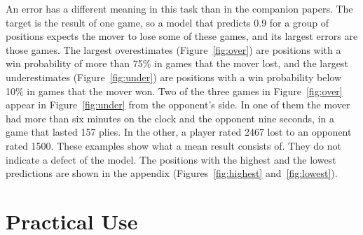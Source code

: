 \documentclass[11pt]{article}
\begin{document}
An error has a different meaning in this task than in the companion papers.
The target is the result of one game, so a model that predicts 0.9 for a
group of positions expects the mover to lose some of these games, and its
largest errors are those games. The largest overestimates
(Figure~\ref{fig:over}) are positions with a win probability of more than
75\% in games that the mover lost, and the largest underestimates
(Figure~\ref{fig:under}) are positions with a win probability below 10\% in
games that the mover won. Two of the three games in Figure~\ref{fig:over}
appear in Figure~\ref{fig:under} from the opponent's side. In one of them the
mover had more than six minutes on the clock and the opponent nine seconds,
in a game that lasted 157 plies. In the other, a player rated 2467 lost to an
opponent rated 1500. These examples show what a mean result consists of. They
do not indicate a defect of the model. The positions with the highest and the
lowest predictions are shown in the appendix (Figures~\ref{fig:highest}
and~\ref{fig:lowest}).



\fi

\section{Practical Use}
\label{sec:use}
\end{document}
